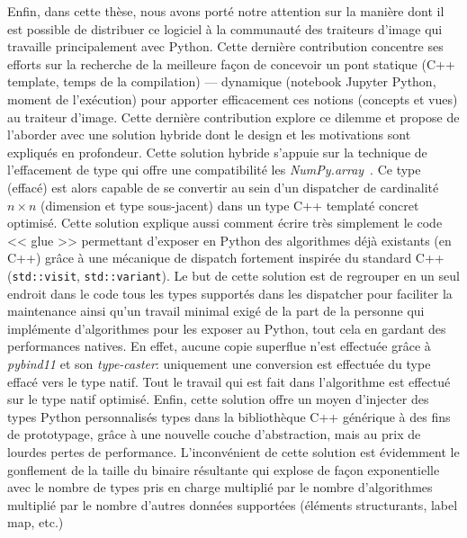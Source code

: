 Enfin, dans cette thèse, nous avons porté notre attention sur la manière dont il est possible de distribuer ce logiciel
à la communauté des traiteurs d'image qui travaille principalement avec Python. Cette dernière contribution concentre
ses efforts sur la recherche de la meilleure façon de concevoir un pont statique (C++ template, temps de la compilation)
--- dynamique (notebook Jupyter Python, moment de l'exécution) pour apporter efficacement ces notions (concepts et vues)
au traiteur d'image. Cette dernière contribution explore ce dilemme et propose de l'aborder avec une solution hybride
dont le design et les motivations sont expliqués en profondeur. Cette solution hybride s'appuie sur la technique de
l'effacement de type qui offre une compatibilité les \emph{NumPy.array}~\parencite{harris.2020.numpy}. Ce type (effacé)
est alors capable de se convertir au sein d'un dispatcher de cardinalité \(n \times n\) (dimension et type sous-jacent)
dans un type C++ templaté concret optimisé. Cette solution explique aussi comment écrire très simplement le code << glue
>> permettant d'exposer en Python des algorithmes déjà existants (en C++) grâce à une mécanique de dispatch fortement
inspirée du standard C++ (\texttt{std::visit}, \texttt{std::variant}). Le but de cette solution est de regrouper en un
seul endroit dans le code tous les types supportés dans les dispatcher pour faciliter la maintenance ainsi qu'un travail
minimal exigé de la part de la personne qui implémente d'algorithmes pour les exposer au Python, tout cela en gardant
des performances natives. En effet, aucune copie superflue n'est effectuée grâce à \emph{pybind11} et son
\emph{type-caster}: uniquement une conversion est effectuée du type effacé vers le type natif. Tout le travail qui est
fait dans l'algorithme est effectué sur le type natif optimisé. Enfin, cette solution offre un moyen d'injecter des
types Python personnalisés types dans la bibliothèque C++ générique à des fins de prototypage, grâce à une nouvelle
couche d'abstraction, mais au prix de lourdes pertes de performance. L'inconvénient de cette solution est évidemment le
gonflement de la taille du binaire résultante qui explose de façon exponentielle avec le nombre de types pris en charge
multiplié par le nombre d'algorithmes multiplié par le nombre d'autres données supportées (éléments structurants, label
map, etc.)

